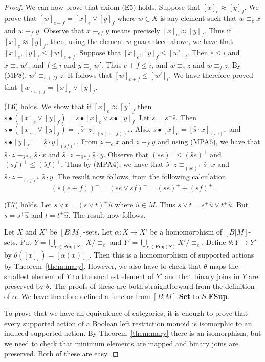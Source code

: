 \documentclass[a4paper]{amsart}
\begin{document}
\begin{proof}
We can now prove that axiom (E5) holds.
Suppose that  $[x]_{e} \approx [y]_{f}$.
We prove that
$[w]_{e + f} = [x]_{e} \vee [y]_{f}$
where $w \in X$ is any element such that 
$w \equiv_{e} x$ and $w \equiv_{f} y$.
Observe that $x \equiv_{ef} y$ means precisely $[x]_{e} \approx [y]_{f}$.
Thus if $[x]_{e} \approx [y]_{f}$, then, using the element $w$ guaranteed above,
we have that $[x]_{e}, [y]_{f} \leq [w]_{e + f}$.
Suppose that $[x]_{e}, [y]_{f} \leq [w']_{i}$.
Then $e \leq i$ and $x \equiv_{e} w'$, and $f \leq i$ and $y \equiv_{f} w'$.
Thus $e + f \leq i$, and $w \equiv_{e} z$ and $w \equiv_{f} z$.
By (MP8), $w' \equiv_{e + f f} z$.
It follows that $[w]_{e + f} \leq [w']_{i}$.
We have therefore proved that $[w]_{e + f} = [x]_{e} \vee [y]_{f}$.

(E6) holds.
We show that if $[x]_{e} \approx [y]_{f}$ then 
$s \bullet ([x]_{e} \vee [y]_{f}) = s \bullet [x]_{e} \vee s \bullet [y]_{f}$.
Let $s = s^{+}\hat{s}$.
Then $s \bullet ([x]_{e} \vee [y]_{f}) = [\hat{s} \cdot z]_{(s(e + f))^{+}}$.
Also, $s \bullet [x]_{e} = [\hat{s} \cdot x]_{(se)^{+}}$ and $s \bullet [y]_{f} = [\hat{s} \cdot y]_{(sf)^{+}}$.
From $z \equiv_{e} x$ and $z \equiv_{f} y$ and using (MPA6),
we have that $\hat{s} \cdot z \equiv_{\hat{s} \ast e} \hat{s} \cdot x$ and $\hat{s} \cdot z \equiv_{\hat{s} \ast f} \hat{s} \cdot y$.
Observe that $(se)^{+} \leq (\hat{s}e)^{+}$ and $(sf)^{+} \leq (\hat{s}f)^{+}$.
Thus by (MPA4), we have that 
$\hat{s} \cdot z \equiv_{(se)^{+}} \hat{s} \cdot x$ and $\hat{s} \cdot z \equiv_{(sf)^{+}} \hat{s} \cdot y$.
The result now follows, from the following calculation
$$(s(e+f))^{+} = (se \vee sf)^{+} = (se)^{+} + (sf)^{+}.$$

(E7) holds.
Let $s \vee t = (s \vee t)^{+}\hat{u}$ where $\hat{u} \in M$.
Thus $s \vee t = s^{+}\hat{u} \vee t^{+}\hat{u}$.
But $s = s^{+}\hat{u}$ and $t = t^{+}\hat{u}$.
The result now follows.

Let $X$ and $X'$ be $[B|M]$-sets.
Let $\alpha \colon X \rightarrow X'$ be a homomorphism of $[B|M]$-sets.
Put $Y = \bigcup_{e \in \mathsf{Proj}(S)} X/\equiv_{e}$
and
$Y' = \bigcup_{e \in \mathsf{Proj}(S)} X'/\equiv_{e}$.
Define $\theta \colon Y \rightarrow Y'$ by $\theta ([x]_{e}) = [\alpha (x)]_{e}$.
Then this is a homomorphism of supported actions by Theorem~\ref{them:mary}.
However, we also have to check that $\theta$ maps the smallest element of $Y$ to the smallest element of $Y'$
and that binary joins in $Y$ are preserved by $\theta$.
The proofs of these are both straightforward from the definition of $\alpha$.
We have therefore defined a functor from $[B|M]$-{\bf Set} to  $S$-{\bf FSup}.

To prove that we have an equivalence of categories, it is enough to prove that 
every supported action of a Boolean left restriction monoid is isomorphic to an induced supported action.
By Theorem~\ref{them:mary} there is an isomorphism,
but we need to check that minimum elements are mapped
and binary joins are preserved.
Both of these are easy.
\end{proof}
\end{document}
